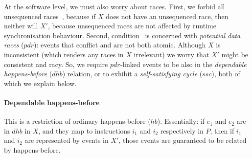 %
At the software level, we must also worry about races. First, we
forbid all unsequenced races~, because if $X$ does
not have an unsequenced race, then neither will $X'$, because
unsequenced races are not affected by runtime synchronisation
behaviour. Second, condition~ is concerned with
\emph{potential data races} ($pdr$): events that conflict and are not
both atomic. Although $X$ is inconsistent (which renders any races in
$X$ irrelevant) we worry that $X'$ might be consistent and racy.  So,
we require $pdr$-linked events to be also in the \emph{dependable
happens-before} ($dhb$) relation, or to exhibit a
\emph{self-satisfying cycle} ($ssc$), both of which we explain below.

\paragraph{Dependable happens-before}
This is a restriction of ordinary happens-before ($hb$). Essentially:
if $e_1$ and $e_2$ are in $dhb$ in $X$, and they map to instructions
$i_1$ and $i_2$ respectively in $P$, then if $i_1$ and $i_2$ are
represented by events in $X'$, those events are guaranteed to be
related by happens-before.

